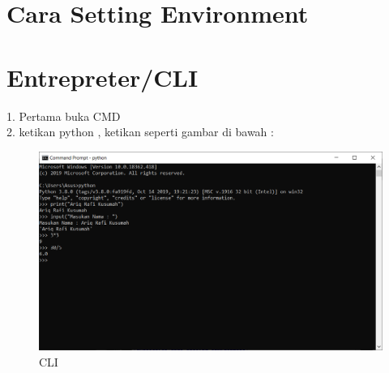 \documentclass[12pt, times new roman, a4paper]{article}
\begin{document}
\section{Cara Setting Environment}

\section{Entrepreter/CLI}
1. Pertama buka CMD\\
2. ketikan python , ketikan seperti gambar di bawah :\\
\begin{figure}[h]
	\centering
		\includegraphics[scale=0.5]{Gambar/CLI}
	\caption{CLI}
\end{figure}
\\
\\
\\
\\
\\
\\
\\
\\
\\
\\
\\
\end{document}

